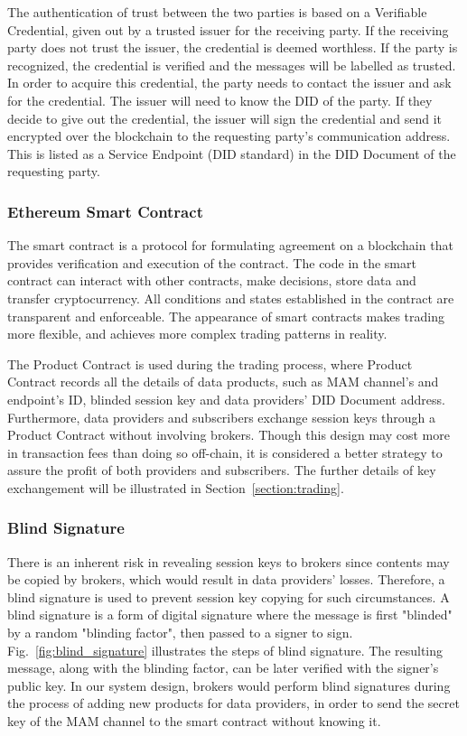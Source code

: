 \documentclass[conference]{IEEEtran}
\begin{document}
The authentication of trust between the two parties is based on a Verifiable Credential, given out by a trusted issuer for the receiving party. If the receiving party does not trust the issuer, the credential is deemed worthless. If the party is recognized, the credential is verified and the messages will be labelled as trusted. In order to acquire this credential, the party needs to contact the issuer and ask for the credential. The issuer will need to know the DID of the party. If they decide to give out the credential, the issuer will sign the credential and send it encrypted over the blockchain to the requesting party's communication address. This is listed as a Service Endpoint (DID standard) in the DID Document of the requesting party.

\subsubsection{Ethereum Smart Contract}
The smart contract is a protocol for formulating agreement on a blockchain that provides verification and execution of the contract. The code in the smart contract can interact with other contracts, make decisions, store data and transfer cryptocurrency. All conditions and states established in the contract are transparent and enforceable. The appearance of smart contracts makes trading more flexible, and achieves more complex trading patterns in reality.

The Product Contract is used during the trading process, where Product Contract records all the details of data products, such as MAM channel's and endpoint's ID, blinded session key and data providers' DID Document address. Furthermore, data providers and subscribers exchange session keys through a Product Contract without involving brokers. Though this design may cost more in transaction fees than doing so off-chain, it is considered a better strategy to assure the profit of both providers and subscribers. The further details of key exchangement will be illustrated in Section~\ref{section:trading}.

\subsubsection{Blind Signature}
There is an inherent risk in revealing session keys to brokers since contents may be copied by brokers, which would result in data providers' losses. Therefore, a blind signature is used to prevent session key copying for such circumstances. A blind signature\cite{blindSig} is a form of digital signature where the message is first "blinded" by a random "blinding factor", then passed to a signer to sign. Fig.~\ref{fig:blind_signature} illustrates the steps of blind signature. The resulting message, along with the blinding factor, can be later verified with the signer's public key. In our system design, brokers would perform blind signatures during the process of adding new products for data providers, in order to send the secret key of the MAM channel to the smart contract without knowing it.
\end{document}
